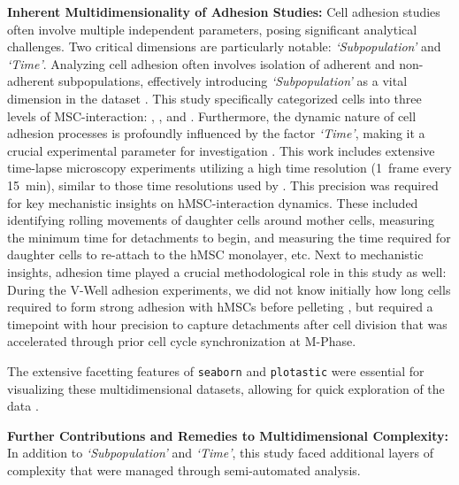 \textbf{Inherent Multidimensionality of Adhesion Studies:}
Cell adhesion studies often involve multiple independent parameters, posing
significant analytical challenges. Two critical dimensions are particularly
notable: \emph{`Subpopulation'} and \emph{`Time'}. Analyzing cell adhesion often
involves isolation of adherent and non-adherent subpopulations, effectively
introducing \textit{`Subpopulation'} as a vital dimension in the dataset
\cite{dziadowiczBoneMarrowStromaInduced2022}. This study specifically
categorized cells into three levels of MSC-interaction: \CMina, \nMAina, and
\MAina. Furthermore, the dynamic nature of cell adhesion processes is profoundly
influenced by the factor \emph{`Time'}, making it a crucial experimental
parameter for investigation \cite{reblTimedependentMetabolicActivity2010,
    mckayCellcellAdhesionMolecules1997,
    bolado-carrancioPeriodicPropagatingWaves2020a}. This work includes extensive
time-lapse microscopy experiments utilizing a high time resolution
(\SI{1}{frame} every \SI{15}{\minute}), similar to those time resolutions used
by \citet{purschkePhototoxicityHoechst333422010}. This precision was required
for key mechanistic insights on hMSC-\INA interaction dynamics. These included
identifying rolling movements of \nMAina daughter cells around \MAina mother
cells, measuring the minimum time for \INA detachments to begin, and measuring
the time required for daughter cells to re-attach to the hMSC monolayer, etc.
Next to mechanistic insights, adhesion time played a crucial methodological role
in this study as well: During the V-Well adhesion experiments, we did not know
initially how long \INA cells required to form strong adhesion with hMSCs before
pelleting \nMAina, but required a timepoint with hour precision to capture
detachments after cell division that was accelerated through prior cell cycle
synchronization at M-Phase.

The extensive facetting features of \texttt{seaborn} and \texttt{plotastic} were
essential for visualizing these multidimensional datasets, allowing for quick
exploration of the data \cite{waskomSeabornStatisticalData2021}.


\textbf{Further Contributions and Remedies to Multidimensional Complexity:}
In addition to \textit{`Subpopulation'} and \textit{`Time'}, this study faced
additional layers of complexity that were managed through semi-automated
analysis.

